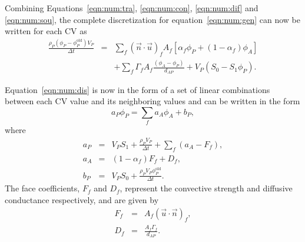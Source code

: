 Combining Equations~\eqref{eqn:num:tra}, \eqref{eqn:num:con},
\eqref{eqn:num:dif} and \eqref{eqn:num:sou}, the complete
discretization for equation~\eqref{eqn:num:gen} can now be written for
each CV as
\begin{eqnarray}
\frac{\rho_{P}(\phi_{P} - \phi_P^\text{old}) V_P}{\Delta t}
&=&
\sum_{f} (\vec{n} \cdot \vec{u})_f A_f 
\left[\alpha_f \phi_P +\left(1-\alpha_f\right)\phi_A\right]
\nonumber \\
&&+
\sum_f \Gamma_f A_f \frac{(\phi_A-\phi_P)}{d_{AP}}
+ 
V_P ( S_0 - S_1 \phi_P ).
\label{eqn:num:dis}
\end{eqnarray}

Equation~\eqref{eqn:num:dis} is now in the form of a set of linear
combinations between each CV value and its neighboring values and can be
written in the form
\begin{equation}
a_P \phi_P = \sum_f a_{A} \phi_{A} + b_P,
\label{eqn:num:dap}
\end{equation}
where
\begin{eqnarray}
a_P & = & V_P S_1 + \frac{\rho_P V_P}{\Delta t} + \sum_f (a_{A} -
F_f), \\
a_{A} & = & ( 1 - \alpha_f ) F_f + D_f, \\
b_P & = & V_P S_0 + \frac{\rho_P V_P \phi_P^\text{old}}{\Delta t}.
\end{eqnarray}
The face coefficients, $F_f$ and $D_f$, represent the convective strength
and diffusive conductance respectively, and are given by
\begin{eqnarray}
F_f & = & A_f ( \vec{u} \cdot \vec{n} )_f, \\
D_f & = & \frac{A_f \Gamma_f}{d_{AP}} .
\end{eqnarray}












